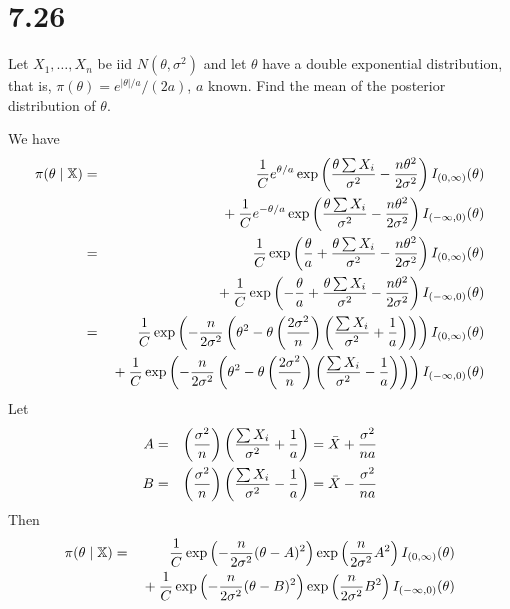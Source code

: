 \section*{7.26}
Let $X_1,\ldots,X_n$ be iid $N(\theta,\sigma^2)$ and let $\theta$
have a double exponential distribution, that is,
$\pi(\theta)=e^{|\theta|/a}/(2a)$, $a$ known.
Find the mean of the posterior distribution of $\theta$.

\bigskip
\noindent
We have
\begin{eqnarray*}
\pi({\theta\mid\mathbb X})
&=&
{1\over C}e^{\theta/a}\exp\left(
{\theta\sum X_i\over\sigma^2}-{n\theta^2\over2\sigma^2}
\right)
I_{(0,\infty)}(\theta)
\\
&&{}+
{1\over C}e^{-\theta/a}\exp\left(
{\theta\sum X_i\over\sigma^2}-{n\theta^2\over2\sigma^2}
\right)
I_{(-\infty,0)}(\theta)
\\
&=&
{1\over C}\exp\left({\theta\over a}+
{\theta\sum X_i\over\sigma^2}-{n\theta^2\over2\sigma^2}
\right)
I_{(0,\infty)}(\theta)
\\
&&{}+
{1\over C}\exp\left(-{\theta\over a}+
{\theta\sum X_i\over\sigma^2}-{n\theta^2\over2\sigma^2}
\right)
I_{(-\infty,0)}(\theta)
\\
&=&
{1\over C}\exp\left(
-{n\over2\sigma^2}
\left(
\theta^2-\theta
\left({2\sigma^2\over n}\right)
\left({\sum X_i\over\sigma^2}+{1\over a}\right)
\right)
\right)I_{(0,\infty)}(\theta)
\\
&&{}+
{1\over C}\exp\left(
-{n\over2\sigma^2}
\left(
\theta^2-\theta
\left({2\sigma^2\over n}\right)
\left({\sum X_i\over\sigma^2}-{1\over a}\right)
\right)
\right)I_{(-\infty,0)}(\theta)
\end{eqnarray*}
Let
\begin{eqnarray*}
A&=&\left({\sigma^2\over n}\right)
\left({\sum X_i\over\sigma^2}+{1\over a}\right)
=\bar X+{\sigma^2\over na}\\
B&=&\left({\sigma^2\over n}\right)
\left({\sum X_i\over\sigma^2}-{1\over a}\right)
=\bar X-{\sigma^2\over na}
\end{eqnarray*}
Then
\begin{eqnarray*}
\pi(\theta\mid\mathbb X)&=&
{1\over C}\exp\left(-{n\over2\sigma^2}(\theta-A)^2\right)
\exp\left({n\over2\sigma^2}A^2\right)
I_{(0,\infty)}(\theta)\\
&&{}+
{1\over C}\exp\left(-{n\over2\sigma^2}(\theta-B)^2\right)
\exp\left({n\over2\sigma^2}B^2\right)
I_{(-\infty,0)}(\theta)\\
%
\end{eqnarray*}
